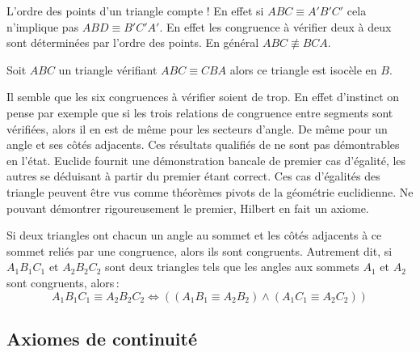 \begin{rema}
    L'ordre des points d'un triangle compte ! En effet si $ABC\equiv A'B'C'$ cela n'implique pas $ABD\equiv B'C'A'$. En effet les congruence à vérifier deux à deux sont déterminées par l'ordre des points. En général $ABC \not \equiv BCA$. 
\end{rema}
\begin{rema}
    Soit $ABC$ un triangle vérifiant $ABC \equiv CBA$ alors ce triangle est isocèle en $B$.
\end{rema}
Il semble que les six congruences à vérifier soient de trop. En effet d'instinct on pense par exemple que si les trois relations de congruence entre segments sont vérifiées, alors il en est de même pour les secteurs d'angle. De même pour un angle et ses côtés adjacents. Ces résultats qualifiés de  ne sont pas démontrables en l'état. Euclide fournit une démonstration bancale de premier cas d'égalité, les autres se déduisant à partir du premier étant correct. Ces cas d'égalités des triangle peuvent être vus comme théorèmes pivots de la géométrie euclidienne. Ne pouvant démontrer rigoureusement le premier, Hilbert en fait un axiome.    
\begin{axi}\label{axi-C6}
    Si deux triangles ont chacun un angle au sommet et les côtés adjacents à ce sommet reliés par une congruence, alors ils sont congruents.
    Autrement dit, si $A_1B_1C_1$ et $A_2B_2C_2$ sont deux triangles tels que les angles aux sommets $A_1$ et $A_2$ sont congruents, alors\,:
    \begin{equation*}
        A_1B_1C_1\equiv A_2B_2C_2\Leftrightarrow((A_1B_1\equiv A_2B_2)\wedge (A_1C_1\equiv A_2C_2))
    \end{equation*}
\end{axi}

        \subsection{Axiomes de continuité}\setcounter{axi}{0}\setcounter{serieaxiom}{4}

